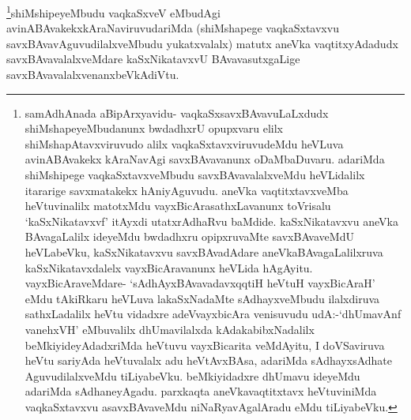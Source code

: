 \begin{artha}
\footnote{samAdhAnada aBipArxyavidu- vaqkaSxsavxBAvavuLaLxdudx shiMshapeyeMbudanunx bwdadhxrU opupxvaru elilx shiMshapAtavxviruvudo alilx vaqkaSxtavxviruvudeMdu heVLuva avinABAvakekx kAraNavAgi savxBAvavanunx oDaMbaDuvaru. adariMda shiMshipege vaqkaSxtavxveMbudu savxBAvavalalxveMdu heVLidalilx itararige savxmatakekx hAniyAguvudu. aneVka vaqtitxtavxveMba heVtuvinalilx matotxMdu vayxBicArasathxLavanunx toVrisalu `kaSxNikatavxvf' itAyxdi utatxrAdhaRvu baMdide. kaSxNikatavxvu aneVka BAvagaLalilx ideyeMdu bwdadhxru opipxruvaMte savxBAvaveMdU heVLabeVku, kaSxNikatavxvu savxBAvadAdare aneVkaBAvagaLalilxruva kaSxNikatavxdalelx vayxBicAravanunx heVLida hAgAyitu. vayxBicAraveMdare- `sAdhAyxBAvavadavxqqtiH heVtuH vayxBicAraH' eMdu tAkiRkaru heVLuva lakaSxNadaMte sAdhayxveMbudu ilalxdiruva sathxLadalilx heVtu vidadxre adeVvayxbicAra venisuvudu udA:-`dhUmavAnf vanehxVH' eMbuvalilx dhUmavilalxda kAdakabibxNadalilx beMkiyideyAdadxriMda heVtuvu vayxBicarita veMdAyitu, I doVSaviruva heVtu sariyAda heVtuvalalx adu heVtAvxBAsa, adariMda sAdhayxsAdhate AguvudilalxveMdu tiLiyabeVku. beMkiyidadxre dhUmavu ideyeMdu adariMda sAdhaneyAgadu. parxkaqta aneVkavaqtitxtavx heVtuviniMda vaqkaSxtavxvu asavxBAvaveMdu niNaRyavAgalAradu eMdu tiLiyabeVku.}shiMshipeyeMbudu vaqkaSxveV eMbudAgi avinABAvakekxkAraNaviruvudariMda (shiMshapege vaqkaSxtavxvu savxBAvavAguvudilalxveMbudu yukatxvalalx) matutx aneVka vaqtitxyAdadudx savxBAvavalalxveMdare kaSxNikatavxvU BAvavasutxgaLige savxBAvavalalxvenanxbeVkAdiVtu.
\end{artha}
